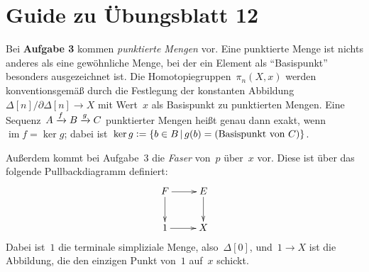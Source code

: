 \documentclass{uebblatt}
\begin{document}
\section*{Guide zu Übungsblatt 12}

Bei \textbf{Aufgabe 3} kommen \emph{punktierte Mengen} vor. Eine punktierte
Menge ist nichts anderes als eine gewöhnliche Menge, bei der ein Element als
"`Basispunkt"' besonders ausgezeichnet ist. Die Homotopiegruppen~$\pi_n(X,x)$ werden
konventionsgemäß durch die Festlegung der konstanten
Abbildung~$\Delta[n]/\partial \Delta[n] \to X$ mit Wert~$x$ als Basispunkt zu
punktierten Mengen. Eine Sequenz~$A \xrightarrow{f} B \xrightarrow{g} C$ punktierter Mengen heißt genau
dann exakt, wenn~$\operatorname{im} f = \operatorname{ker} g$; dabei
ist~$\operatorname{ker} g \vcentcolon= \{ b \in B \,|\, g(b) = (\text{Basispunkt
von~$C$}) \}$.

Außerdem kommt bei Aufgabe~3 die \emph{Faser} von~$p$ über~$x$ vor. Diese ist
über das folgende Pullbackdiagramm definiert:
\[ \xymatrix{
  F \ar[r]\ar[d] & E \ar[d] \\
  1 \ar[r] & X
} \]
Dabei ist~$1$ die terminale simpliziale Menge, also~$\Delta[0]$, und~$1 \to X$
ist die Abbildung, die den einzigen Punkt von~$1$ auf~$x$ schickt.
\end{document}
